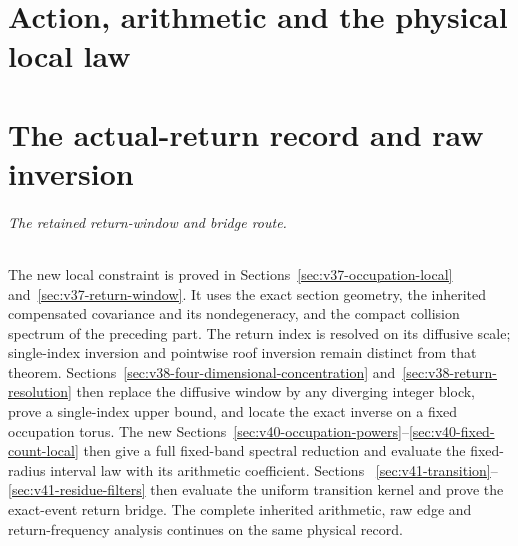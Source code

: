 \documentclass[11pt,reqno]{amsart}
\numberwithin{equation}{section}
\theoremstyle{definition}\newtheorem{definition}[theorem]{Definition}
\theoremstyle{remark}\newtheorem{remark}[theorem]{Remark}
\begin{document}
\part{Action, arithmetic and the physical local law}









\part{The actual-return record and raw inversion}
\paragraph{The retained return-window and bridge route.}
The new local constraint is proved in
Sections~\ref{sec:v37-occupation-local} and~\ref{sec:v37-return-window}.
It uses the exact section geometry, the inherited compensated
covariance and its nondegeneracy, and the compact collision spectrum
of the preceding part. The return index is resolved on its diffusive scale;
single-index inversion and pointwise roof inversion remain distinct
from that theorem. Sections~\ref{sec:v38-four-dimensional-concentration}
and~\ref{sec:v38-return-resolution} then replace the diffusive window
by any diverging integer block, prove a single-index upper bound, and
locate the exact inverse on a fixed occupation torus. The new
Sections~\ref{sec:v40-occupation-powers}--\ref{sec:v40-fixed-count-local}
then give a full fixed-band spectral reduction and evaluate the
fixed-radius interval law with its arithmetic coefficient. Sections~
\ref{sec:v41-transition}--\ref{sec:v41-residue-filters} then evaluate
the uniform transition kernel and prove the exact-event return bridge. The
complete inherited arithmetic, raw edge and return-frequency analysis
continues on the same physical record.

















\end{document}
